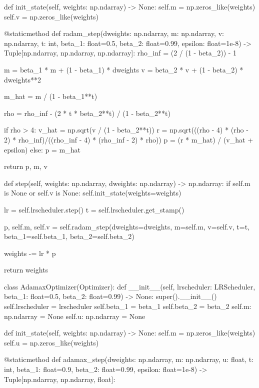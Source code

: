 \documentclass[14pt, a4paper]{article}
\theoremstyle{sltheorem}
\theoremstyle{soltheorem}
\begin{document}
\begin{python}
    def init_state(self, weights: np.ndarray) -> None:
        self.m = np.zeros_like(weights)
        self.v = np.zeros_like(weights)
        
        
    @staticmethod
    def radam_step(dweights: np.ndarray, m: np.ndarray, v: np.ndarray, t: int, beta_1: float=0.5, beta_2: float=0.99, epsilon: float=1e-8) -> Tuple[np.ndarray, np.ndarray, np.ndarray]:
        rho_inf = (2 / (1 - beta_2)) - 1

        m = beta_1 * m + (1 - beta_1) * dweights
        v = beta_2 * v + (1 - beta_2) * dweights**2

        m_hat = m / (1 - beta_1**t)

        rho = rho_inf - (2 * t * beta_2**t) / (1 - beta_2**t)

        if rho > 4:
            v_hat = np.sqrt(v / (1 - beta_2**t))
            r = np.sqrt(((rho - 4) * (rho - 2) * rho_inf)/((rho_inf - 4) * (rho_inf - 2) * rho))
            p = (r * m_hat) / (v_hat + epsilon)
        else:
            p = m_hat

        return p, m, v
    
    
    def step(self, weights: np.ndarray, dweights: np.ndarray) -> np.ndarray:
        if self.m is None or self.v is None:
            self.init_state(weights=weights)
        
        lr = self.lrscheduler.step()
        t = self.lrscheduler.get_stamp()
        
        p, self.m, self.v = self.radam_step(dweights=dweights, m=self.m, v=self.v, t=t,
                                            beta_1=self.beta_1, beta_2=self.beta_2)
        
        weights -= lr * p
        
        return weights
    
    
class AdamaxOptimizer(Optimizer):
    def __init__(self, lrscheduler: LRScheduler, beta_1: float=0.5, beta_2: float=0.99) -> None:
        super().__init__()
        self.lrscheduler = lrscheduler
        self.beta_1 = beta_1
        self.beta_2 = beta_2
        self.m: np.ndarray = None
        self.u: np.ndarray = None
        
        
    def init_state(self, weights: np.ndarray) -> None:
        self.m = np.zeros_like(weights)
        self.u = np.zeros_like(weights)
        
    @staticmethod
    def adamax_step(dweights: np.ndarray, m: np.ndarray, u: float, t: int, beta_1: float=0.9, beta_2: float=0.99, epsilon: float=1e-8) -> Tuple[np.ndarray, np.ndarray, float]:


\end{python}
\end{document}
